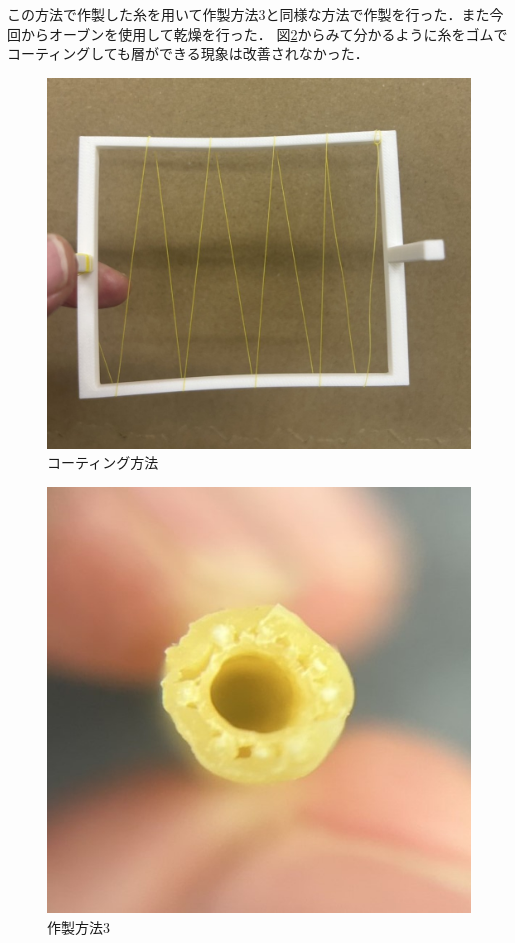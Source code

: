 この方法で作製した糸を用いて作製方法3と同様な方法で作製を行った．また今回からオーブンを使用して乾燥を行った．
図\ref{fig:27}からみて分かるように糸をゴムでコーティングしても層ができる現象は改善されなかった．
\begin{figure}[h]
  \centering  %
  \includegraphics[scale=0.2]{pic/25.jpg}
  \caption{コーティング方法}
  \label{fig:26}
\end{figure}
\begin{figure}[h]
  \centering  %
  \includegraphics[scale=0.4]{pic/26.jpg}
  \caption{作製方法3}
  \label{fig:27}
\end{figure}
